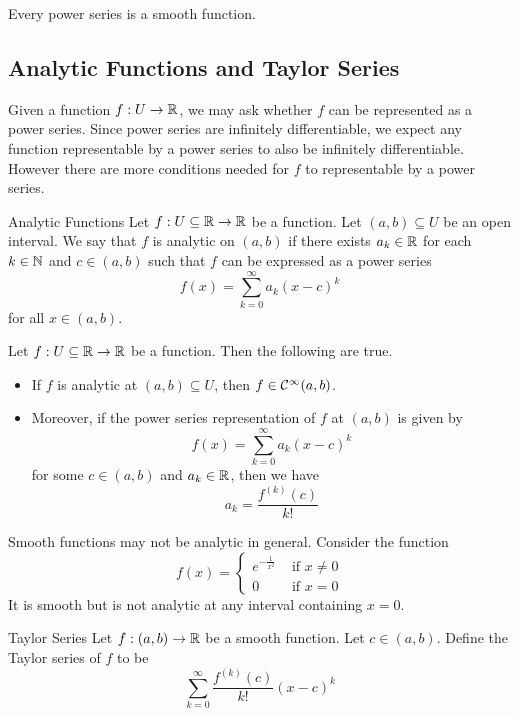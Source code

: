 \documentclass[a4paper]{article}
\begin{document}
\begin{lmm}{}{} Every power series is a smooth function. 
\end{lmm}

\subsection{Analytic Functions and Taylor Series}
Given a function $f:U\to\mathbb{R}$, we may ask whether $f$ can be represented as a power series. Since power series are infinitely differentiable, we expect any function representable by a power series to also be infinitely differentiable. However there are more conditions needed for $f$ to representable by a power series. 

\begin{defn}{Analytic Functions}{} Let $f:U\subseteq\mathbb{R}\to\mathbb{R}$ be a function. Let $(a,b)\subseteq U$ be an open interval. We say that $f$ is analytic on $(a,b)$ if there exists $a_k\in\mathbb{R}$ for each $k\in\mathbb{N}$ and $c\in(a,b)$ such that $f$ can be expressed as a power series $$f(x)=\sum_{k=0}^\infty a_k(x-c)^k$$ for all $x\in(a,b)$. 
\end{defn}

\begin{prp}{}{} Let $f:U\subseteq\mathbb{R}\to\mathbb{R}$ be a function. Then the following are true. 
\begin{itemize}
\item If $f$ is analytic at $(a,b)\subseteq U$, then $f\in\mathcal{C}^\infty(a,b)$. 
\item Moreover, if the power series representation of $f$ at $(a,b)$ is given by $$f(x)=\sum_{k=0}^\infty a_k(x-c)^k$$ for some $c\in(a,b)$ and $a_k\in\mathbb{R}$, then we have $$a_k=\frac{f^{(k)}(c)}{k!}$$
\end{itemize}
\end{prp}

Smooth functions may not be analytic in general. Consider the function $$f(x)=\begin{cases}
e^{-\frac{1}{x^2}} & \text{ if }x\neq 0\\
0 & \text{ if } x=0
\end{cases}$$
It is smooth but is not analytic at any interval containing $x=0$. 

\begin{defn}{Taylor Series}{} Let $f:(a,b)\to\mathbb{R}$ be a smooth function. Let $c\in(a,b)$. Define the Taylor series of $f$ to be $$\sum_{k=0}^{\infty}\frac{f^{(k)}(c)}{k!}(x-c)^k$$
\end{defn}
\end{document}
